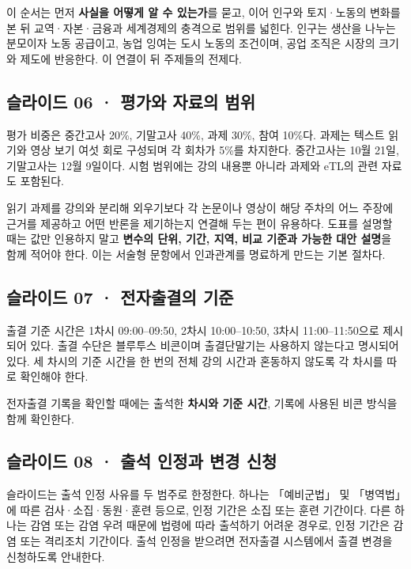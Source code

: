 \documentclass[10pt,a4paper]{article}
\begin{document}
이 순서는 먼저 \textbf{사실을 어떻게 알 수 있는가}를 묻고, 이어 인구와 토지·노동의 변화를 본 뒤 교역·자본·금융과 세계경제의 충격으로 범위를 넓힌다. 인구는 생산을 나누는 분모이자 노동 공급이고, 농업 잉여는 도시 노동의 조건이며, 공업 조직은 시장의 크기와 제도에 반응한다. 이 연결이 뒤 주제들의 전제다.\par

\subsection{슬라이드 06 · 평가와 자료의 범위}
평가 비중은 중간고사 20\%, 기말고사 40\%, 과제 30\%, 참여 10\%다. 과제는 텍스트 읽기와 영상 보기 여섯 회로 구성되며 각 회차가 5\%를 차지한다. 중간고사는 10월 21일, 기말고사는 12월 9일이다. 시험 범위에는 강의 내용뿐 아니라 과제와 eTL의 관련 자료도 포함된다.\par

읽기 과제를 강의와 분리해 외우기보다 각 논문이나 영상이 해당 주차의 어느 주장에 근거를 제공하고 어떤 반론을 제기하는지 연결해 두는 편이 유용하다. 도표를 설명할 때는 값만 인용하지 말고 \textbf{변수의 단위, 기간, 지역, 비교 기준과 가능한 대안 설명}을 함께 적어야 한다. 이는 서술형 문항에서 인과관계를 명료하게 만드는 기본 절차다.\par

\subsection{슬라이드 07 · 전자출결의 기준}
출결 기준 시간은 1차시 09:00–09:50, 2차시 10:00–10:50, 3차시 11:00–11:50으로 제시되어 있다. 출결 수단은 블루투스 비콘이며 출결단말기는 사용하지 않는다고 명시되어 있다. 세 차시의 기준 시간을 한 번의 전체 강의 시간과 혼동하지 않도록 각 차시를 따로 확인해야 한다.\par

전자출결 기록을 확인할 때에는 출석한 \textbf{차시와 기준 시간}, 기록에 사용된 비콘 방식을 함께 확인한다.\par

\subsection{슬라이드 08 · 출석 인정과 변경 신청}
슬라이드는 출석 인정 사유를 두 범주로 한정한다. 하나는 「예비군법」 및 「병역법」에 따른 검사·소집·동원·훈련 등으로, 인정 기간은 소집 또는 훈련 기간이다. 다른 하나는 감염 또는 감염 우려 때문에 법령에 따라 출석하기 어려운 경우로, 인정 기간은 감염 또는 격리조치 기간이다. 출석 인정을 받으려면 전자출결 시스템에서 출결 변경을 신청하도록 안내한다.\par
\end{document}
